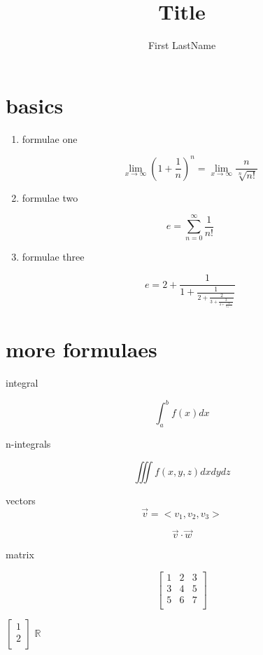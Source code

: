\documentclass{article}
\title{Title}
\author{First LastName}
\newcommand{\cv}[2]{\begin{bmatrix}
    #1\\
    #2\\
\end{bmatrix}}
\begin{document}
\maketitle
\section{basics}

\begin{enumerate}

    \item {formulae one}

          $$ \lim_{x \to\infty} \left(1 + \frac{1}{n}\right)^n = \lim_{x \to\infty} \frac{n}{\sqrt[n]{n!}} $$

    \item {formulae two}

          $$ e = \sum_{n = 0}^{\infty} \frac{1}{n!} $$

    \item {formulae three}

          $$e = 2 + \frac{1}{1 + \frac{1}{2 + \frac{2}{3 + \frac{3}{4 + \frac{4}{5 + \ddots}}}}} $$

\end{enumerate}

\section{more formulaes}

integral

$$\int_a^b f(x)dx$$

n-integrals

$$\iiint f(x,y,z)dxdydz$$

vectors
$$\vec{v} = <v_1, v_2 , v_3>$$

\[\vec{v} \cdot \vec{w}\]
\pagebreak

matrix

$$
    \begin{bmatrix}
        1 & 2 & 3 \\
        3 & 4 & 5 \\
        5 & 6 & 7 \\
    \end{bmatrix}
$$

$\cv{1}{2}$
$\mathbb{R}$
\end{document}
